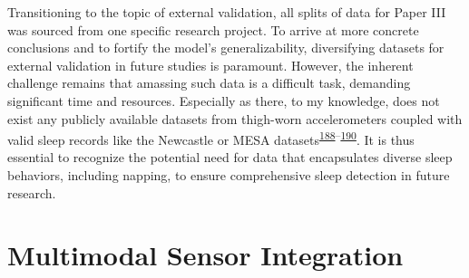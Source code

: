 \documentclass[
  10pt,
]{scrbook}
\begin{document}
Transitioning to the topic of external validation, all splits of data
for Paper III was sourced from one specific research project. To arrive
at more concrete conclusions and to fortify the model's
generalizability, diversifying datasets for external validation in
future studies is paramount. However, the inherent challenge remains
that amassing such data is a difficult task, demanding significant time
and resources. Especially as there, to my knowledge, does not exist any
publicly available datasets from thigh-worn accelerometers coupled with
valid sleep records like the Newcastle or MESA
datasets\textsuperscript{\protect\hyperlink{ref-hees_newcastle_2018}{188}--\protect\hyperlink{ref-chen_2015}{190}}.
It is thus essential to recognize the potential need for data that
encapsulates diverse sleep behaviors, including napping, to ensure
comprehensive sleep detection in future research.

\hypertarget{multimodal-sensor-integration}{%
\section{Multimodal Sensor
Integration}\label{multimodal-sensor-integration}}
\end{document}
